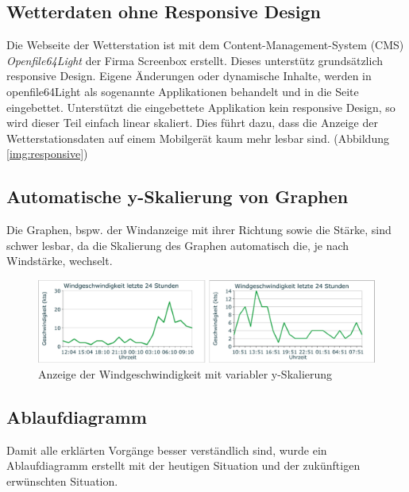 \subsection{Wetterdaten ohne Responsive Design}
Die Webseite der Wetterstation ist mit dem Content-Management-System (CMS) \textit{Openfile64Light} der Firma Screenbox erstellt. Dieses unterstütz grundsätzlich responsive Design. Eigene Änderungen oder dynamische Inhalte, werden in openfile64Light als sogenannte Applikationen behandelt und in die Seite eingebettet. Unterstützt die eingebettete Applikation kein responsive Design, so wird dieser Teil einfach linear skaliert. Dies führt dazu, dass die Anzeige der Wetterstationsdaten auf einem Mobilgerät kaum mehr lesbar sind. (Abbildung \ref{img:responsive})





\subsection{Automatische y-Skalierung von Graphen}
Die Graphen, bspw. der Windanzeige mit ihrer Richtung sowie die Stärke, sind schwer lesbar, da die Skalierung des Graphen automatisch die, je nach Windstärke, wechselt.

\begin{figure}[h!]
	\centering
	\includegraphics[width=1\linewidth]{img/wind-geschw}
	\caption{Anzeige der Windgeschwindigkeit mit variabler y-Skalierung}
	\label{img:wind-geschw}
\end{figure}




 




\subsection{Ablaufdiagramm}
Damit alle erklärten Vorgänge besser verständlich sind, wurde ein Ablaufdiagramm erstellt mit der heutigen Situation und der zukünftigen erwünschten Situation.

